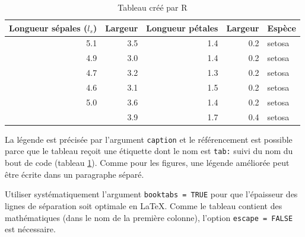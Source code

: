 \documentclass[
  12pt,
  french,
  a4paper,
  extrafontsizes,onecolumn,openright
  ]{memoir}
\newenvironment{Shaded}{\begin{snugshade}}{\end{snugshade}}
\newcommand{\DataTypeTok}[1]{\textcolor[rgb]{0.13,0.29,0.53}{#1}}
\newcommand{\KeywordTok}[1]{\textcolor[rgb]{0.13,0.29,0.53}{\textbf{#1}}}
\newcommand{\NormalTok}[1]{#1}
\newcommand{\OperatorTok}[1]{\textcolor[rgb]{0.81,0.36,0.00}{\textbf{#1}}}
\newcommand{\OtherTok}[1]{\textcolor[rgb]{0.56,0.35,0.01}{#1}}
\newcommand{\StringTok}[1]{\textcolor[rgb]{0.31,0.60,0.02}{#1}}
\begin{document}
\begin{Shaded}
\end{Shaded}

\begin{table}

\caption{\label{tab:kable}Tableau créé par R}
\centering
\begin{tabular}[t]{rrrrl}
\toprule
Longueur sépales ($l_s$) & Largeur & Longueur pétales & Largeur & Espèce\\
\midrule
5.1 & 3.5 & 1.4 & 0.2 & setosa\\
4.9 & 3.0 & 1.4 & 0.2 & setosa\\
4.7 & 3.2 & 1.3 & 0.2 & setosa\\
4.6 & 3.1 & 1.5 & 0.2 & setosa\\
5.0 & 3.6 & 1.4 & 0.2 & setosa\\
\addlinespace
5.4 & 3.9 & 1.7 & 0.4 & setosa\\
\bottomrule
\end{tabular}
\end{table}

\normalsize

La légende est précisée par l'argument \texttt{caption} et le référencement est possible parce que le tableau reçoit une étiquette dont le nom est \texttt{tab:} suivi du nom du bout de code (tableau \ref{tab:kable}).
Comme pour les figures, une légende améliorée peut être écrite dans un paragraphe séparé.

Utiliser systématiquement l'argument \texttt{booktabs\ =\ TRUE} pour que l'épaisseur des lignes de séparation soit optimale en LaTeX.
Comme le tableau contient des mathématiques (dans le nom de la première colonne), l'option \texttt{escape\ =\ FALSE} est nécessaire.
\end{document}
